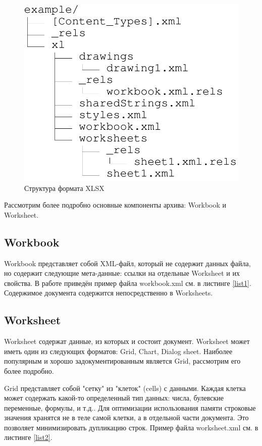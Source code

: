 \documentclass[14pt]{matmex-diploma-custom}
\begin{document}
\begin{figure}
     \centering
     \includegraphics[scale=1]{pics/xlsx.png}
     \caption{Структура формата XLSX}\label{xlsx_tree}
\end{figure}

Рассмотрим более подробно основные компоненты архива: Workbook и Worksheet.
\subsection{Workbook}
Workbook представляет собой XML-файл, который не содержит данных файла, но содержит следующие мета-данные: ссылки на отдельные Worksheet и их свойства. В работе приведён пример файла workbook.xml см. в листинге \ref{list1}. Содержимое документа содержится непосредственно в Worksheets.
\subsection{Worksheet}
Worksheet содержат данные, из которых и состоит документ. Worksheet может иметь один из следующих форматов: Grid, Chart, Dialog sheet. Наиболее популярным и хорошо задокументированным является Grid, рассмотрим его более подробно.

Grid представляет собой "сетку" из "клеток" (cells) с данными. Каждая клетка может содержать какой-то определенный тип данных: числа, булевские переменные, формулы, и т.д.. Для оптимизации использования памяти строковые значения хранятся не в теле самой клетки, а в отдельной части документа. Это позволяет минимизировать дупликацию строк. Пример файла worksheet.xml см. в листинге \ref{list2}.
\end{document}
